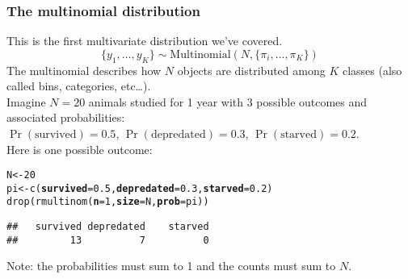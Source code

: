 \documentclass[color=usenames,dvipsnames]{beamer}\usepackage[]{graphicx}\usepackage[]{color}
\makeatletter
\newcommand{\hlnum}[1]{\textcolor[rgb]{0.69,0.494,0}{#1}}%
\newcommand{\hlstd}[1]{\textcolor[rgb]{0,0,0}{#1}}%
\newcommand{\hlkwb}[1]{\textcolor[rgb]{0,0.341,0.682}{#1}}%
\newcommand{\hlkwc}[1]{\textcolor[rgb]{0,0,0}{\textbf{#1}}}%
\newcommand{\hlkwd}[1]{\textcolor[rgb]{0.004,0.004,0.506}{#1}}%
\newenvironment{kframe}{%
 \def\at@end@of@kframe{}%
 \ifinner\ifhmode%
  \def\at@end@of@kframe{\end{minipage}}%
  \begin{minipage}{\columnwidth}%
 \fi\fi%
 \def\FrameCommand##1{\hskip\@totalleftmargin \hskip-\fboxsep
 \colorbox{shadecolor}{##1}\hskip-\fboxsep
     \hskip-\linewidth \hskip-\@totalleftmargin \hskip\columnwidth}%
 \MakeFramed {\advance\hsize-\width
   \@totalleftmargin\z@ \linewidth\hsize
   \@setminipage}}%
 {\par\unskip\endMakeFramed%
 \at@end@of@kframe}
\newenvironment{knitrout}{}{} %
\makeatother
\begin{document}
\begin{frame}[fragile]
  \frametitle{The multinomial distribution}
  \small
  This is the first multivariate distribution we've covered. \\
  \[
    \{y_{1}, \dots, y_{K}\}  \sim \mathrm{Multinomial}(N, \{\pi_i, \dots, \pi_K\})
  \]
  \pause
  The multinomial describes how $N$ objects are distributed among
  $K$ classes (also called bins, categories, etc\dots). \\
  \pause
  \vfill
  Imagine $N=20$ animals studied for 1 year with 3 possible outcomes
  and associated probabilities: \\
  $\Pr(\mathrm{survived})=0.5$, $\Pr(\mathrm{depredated})=0.3$, $\Pr(\mathrm{starved})=0.2$. \\
  \pause
  \vfill
  Here is one possible outcome:
  \vspace{-6pt}
\begin{knitrout}\footnotesize
{}\color{fgcolor}\begin{kframe}
\begin{alltt}
\hlstd{N} \hlkwb{<-} \hlnum{20}
\hlstd{pi} \hlkwb{<-} \hlkwd{c}\hlstd{(}\hlkwc{survived}\hlstd{=}\hlnum{0.5}\hlstd{,} \hlkwc{depredated}\hlstd{=}\hlnum{0.3}\hlstd{,} \hlkwc{starved}\hlstd{=}\hlnum{0.2}\hlstd{)}
\hlkwd{drop}\hlstd{(}\hlkwd{rmultinom}\hlstd{(}\hlkwc{n}\hlstd{=}\hlnum{1}\hlstd{,} \hlkwc{size}\hlstd{=N,} \hlkwc{prob}\hlstd{=pi))}
\end{alltt}
\begin{verbatim}
##   survived depredated    starved 
##         13          7          0
\end{verbatim}
\end{kframe}
\end{knitrout}
  \pause
  \vfill
  \centering
  Note: the probabilities must sum to 1 and the counts must sum to $N$. \\
\end{frame}
\end{document}
